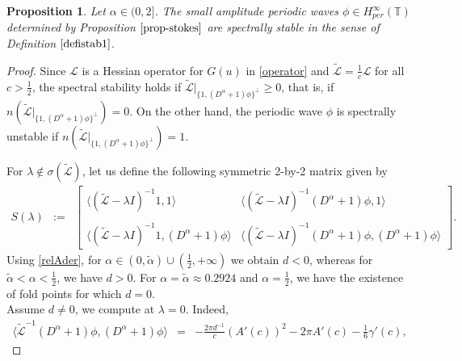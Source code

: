 \documentclass[12pt,reqno]{amsart}
\newcommand{\2}{L^2_{per}(0, T)}
\numberwithin{equation}{section}
\numberwithin{figure}{section}
\newtheorem{proposition}[theorem]{Proposition}
\begin{document}
	\begin{proposition}\label{propstability}
 Let $\alpha \in (0, 2]$.  The small amplitude periodic waves $\phi  \in H^{\infty}_{per}(\mathbb{T})$ determined by Proposition $\ref{prop-stokes}$ are spectrally stable in the sense of Definition $\ref{defistab1}$.

	\end{proposition}
\begin{proof}
Since $\mathcal{L}$ is a Hessian operator for $G(u)$ in \eqref{operator} and $\mathcal{\tilde{L}}=\frac{1}{c}\mathcal{L}$ for all $c>\frac{1}{2}$, the spectral stability holds if $\mathcal{\tilde{L}}|_{\{1, (D^\alpha +1)\phi\}^{\bot}} \geq0$, that is, if $n(\mathcal{\tilde{L}}|_{\{1, (D^\alpha +1)\phi\}^{\bot}})=0$. On the other hand, the periodic wave $\phi$ is spectrally unstable if  $n(\mathcal{\tilde{L}}|_{\{1, (D^\alpha +1)\phi\}^{\bot}})=1$.

For $\lambda \notin \sigma(\mathcal{\tilde{L}})$, let us define the following symmetric 2-by-2 matrix given by
	\begin{eqnarray*} S(\lambda)&:=& \left[
	\begin{array}{cc}
	\langle (\mathcal{\tilde{L}}- \lambda I)^{-1}1, 1 \rangle &  						 \langle(\mathcal{\tilde{L}}- \lambda I)^{-1}(D^\alpha +1)\phi, 1 \rangle \\
	& \\
	\langle (\mathcal{\tilde{L}}- \lambda I)^{-1}1, (D^\alpha +1)\phi \rangle & \langle (\mathcal{\tilde{L}}- \lambda 			I)^{-1}(D^\alpha +1)\phi, (D^\alpha +1)\phi \rangle
	\end{array}\right].
	\end{eqnarray*}
Using  \eqref{relAder}, for $\alpha\in (0,\tilde{\alpha})\cup(\frac{1}{2},+\infty)$ we obtain $d<0$, whereas for $\tilde{\alpha}<\alpha<\frac{1}{2}$, we have $d>0$. For $\alpha=\tilde{\alpha}\approx 0.2924$ and $\alpha= \frac{1}{2}$, we have the existence of fold points for which $d=0$.\\
\indent Assume $d \neq 0$, we compute at $\lambda=0$. Indeed,
	\begin{eqnarray}\label{first-term}
	\langle \mathcal{\tilde{L}}^{-1}(D^\alpha +1)\phi, (D^\alpha +1)\phi \rangle & = &\displaystyle - \frac{2 \pi 	 d^{-1}}{c}(A'(c))^2 - 2\pi A'(c) -\frac{1}{6}\gamma'(c) ,
	\end{eqnarray}
	

\end{proof}
\end{document}
